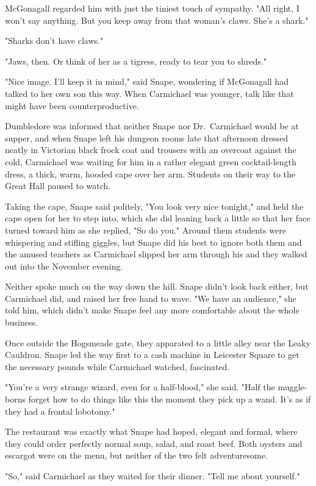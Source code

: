 McGonagall regarded him with just the tiniest touch of sympathy. "All right, I won't say anything. But you keep away from that woman's claws. She's a shark."

"Sharks don't have claws."

"Jaws, then. Or think of her as a tigress, ready to tear you to shreds."

"Nice image. I'll keep it in mind," said Snape, wondering if McGonagall had talked to her own son this way. When Carmichael was younger, talk like that might have been counterproductive.

Dumbledore was informed that neither Snape nor Dr.~Carmichael would be at supper, and when Snape left his dungeon rooms late that afternoon dressed neatly in Victorian black frock coat and trousers with an overcoat against the cold, Carmichael was waiting for him in a rather elegant green cocktail-length dress, a thick, warm, hooded cape over her arm. Students on their way to the Great Hall paused to watch.

Taking the cape, Snape said politely, "You look very nice tonight," and held the cape open for her to step into, which she did leaning back a little so that her face turned toward him as she replied, "So do you." Around them students were whispering and stifling giggles, but Snape did his best to ignore both them and the amused teachers as Carmichael slipped her arm through his and they walked out into the November evening.

Neither spoke much on the way down the hill. Snape didn't look back either, but Carmichael did, and raised her free hand to wave. "We have an audience," she told him, which didn't make Snape feel any more comfortable about the whole business.

Once outside the Hogsmeade gate, they apparated to a little alley near the Leaky Cauldron. Snape led the way first to a cash machine in Leicester Square to get the necessary pounds while Carmichael watched, fascinated.

"You're a very strange wizard, even for a half-blood," she said. "Half the muggle-borns forget how to do things like this the moment they pick up a wand. It's as if they had a frontal lobotomy."

The restaurant was exactly what Snape had hoped, elegant and formal, where they could order perfectly normal soup, salad, and roast beef. Both oysters and escargot were on the menu, but neither of the two felt adventuresome.

"So," said Carmichael as they waited for their dinner. "Tell me about yourself."

